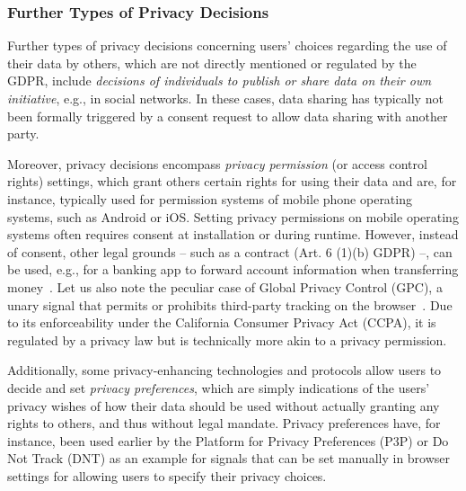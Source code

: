 \subsubsection{Further Types of Privacy Decisions}
\label{subsec:further-decisions}
Further types of privacy decisions concerning users' choices regarding the use of their data by others, which are not directly mentioned or regulated by the GDPR, include \textit{decisions of individuals to publish or share data on their own initiative}, e.g., in social networks. In these cases, data sharing has typically not been formally triggered by a consent request to allow data sharing with another party.

Moreover, privacy decisions encompass \textit{privacy permission} (or access control rights) settings, which grant others certain rights for using their data and are, for instance, typically used for permission systems of mobile phone operating systems, such as Android or iOS.
Setting privacy permissions on mobile operating systems often requires consent at installation or during runtime. 
However, instead of consent, other legal grounds -- such as a contract (Art. 6 (1)(b) GDPR) --, can be used, e.g., for a banking app to forward account information when transferring money~\cite{Art29WP13}.
Let us also note the peculiar case of Global Privacy Control (GPC), a unary signal that permits or prohibits third-party tracking on the browser~\cite{human_data_2022}.
Due to its enforceability under the California Consumer Privacy Act (CCPA), it is regulated by a privacy law but is technically more akin to a privacy permission.

Additionally, some privacy-enhancing technologies and protocols allow users to decide and set \textit{privacy preferences}, which are simply indications of the users' privacy wishes of how their data should be used without actually granting any rights to others, and thus without legal mandate. 
Privacy preferences have, for instance, been used earlier by the Platform for Privacy Preferences (P3P) \cite{cranor_platform_2002} or Do Not Track (DNT) as an example for signals that can be set manually in browser settings for allowing users to specify their privacy choices.









